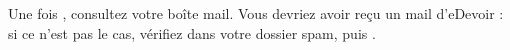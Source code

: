 ﻿Une fois , consultez votre boîte mail.
Vous devriez avoir reçu un mail d'eDevoir : si ce n'est pas le cas, vérifiez dans votre dossier spam, puis .